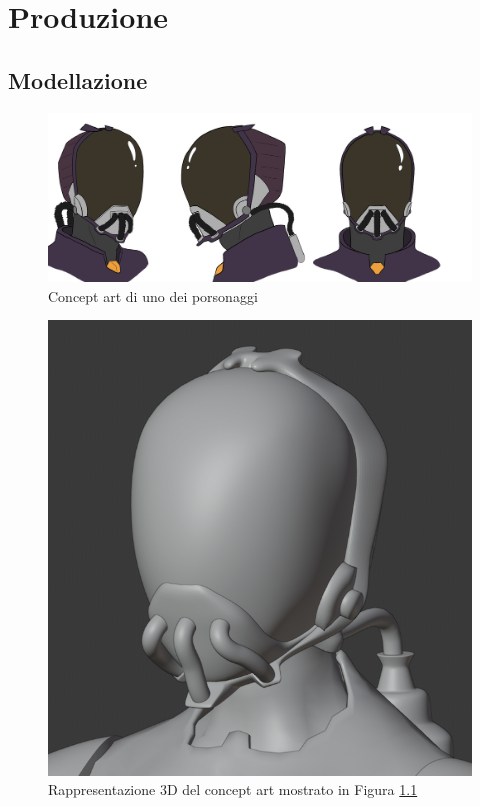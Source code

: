 
\chapter{Produzione} %

\label{Chapter5} %


\section{Modellazione}
\begin{figure}
\centering
\includegraphics[width=.8\textwidth]{Figures/bandit-concept}
\decoRule
\caption[Concept art]{Concept art di uno dei porsonaggi}
\label{fig:concept}
\end{figure}
\begin{figure}
\centering
\includegraphics[width=.8\textwidth]{Figures/bandit-head}
\decoRule
\caption[Modello 3D]{Rappresentazione 3D del concept art mostrato in Figura \ref{fig:concept}}
\label{fig:model}
\end{figure}

